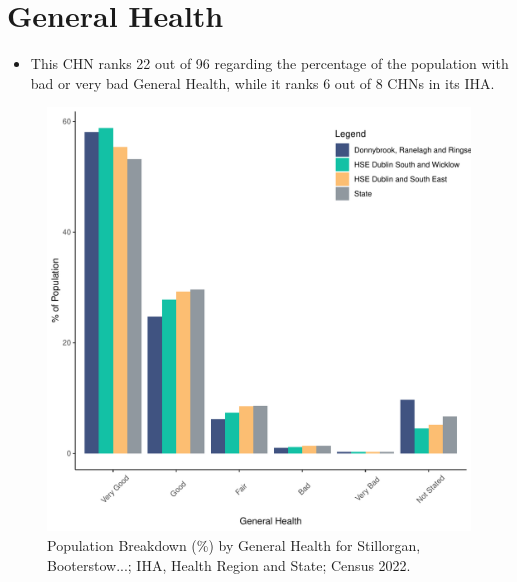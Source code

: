 \documentclass{article}
\begin{document}
\pagebreak

\section{General Health}\label{sect:GenHealth}
\begin{itemize}
\item  This CHN ranks  22 out of 96 regarding the percentage of the population with bad or very bad General Health, while it ranks   6 out of 8 CHNs in its IHA.
\end{itemize}
\begin{figure}[h]
	\centering
	\includegraphics[width = 150mm]{../figures/GenED.pdf}
	\caption{Population Breakdown (\%) by General Health for Stillorgan, Booterstow...; IHA, Health Region and State;  Census 2022.}
	\label{fig:2ae19629-1a6a-13a3-e055-000000000001}
	\end{figure}
\end{document}

